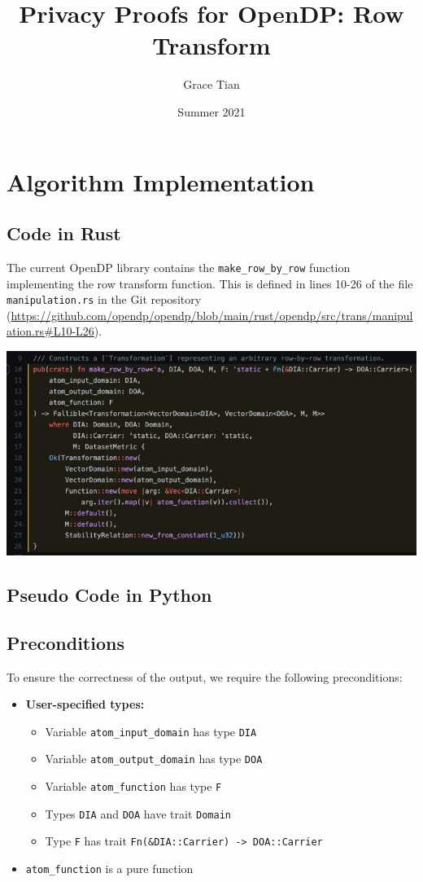 \documentclass[11pt,a4paper]{article}
\title{Privacy Proofs for OpenDP: Row Transform}
\author{Grace Tian}
\date{Summer 2021}
\begin{document}
\maketitle
\tableofcontents


\section{Algorithm Implementation}
\subsection{Code in Rust}
The current OpenDP library contains the \texttt{make\_row\_by\_row} function implementing the row transform function. This is defined in lines 10-26 of the file \texttt{manipulation.rs} in the Git repository (\url{https://github.com/opendp/opendp/blob/main/rust/opendp/src/trans/manipulation.rs#L10-L26}).

\includegraphics[width=\textwidth]{make_row_by_row.jpg}


\subsection{Pseudo Code in Python} \label{sec:pseudocode}

\subsection*{Preconditions}
To ensure the correctness of the output, we require the following preconditions:

\begin{itemize}
    \item \textbf{User-specified types:}
    \begin{itemize}
        \item Variable \texttt{atom\_input\_domain} has type \texttt{DIA}
        \item Variable \texttt{atom\_output\_domain} has type \texttt{DOA}
        \item Variable \texttt{atom\_function} has type \texttt{F}
        \item Types \texttt{DIA} and \texttt{DOA} have trait \texttt{Domain}
        \item Type \texttt{F} has trait \texttt{Fn(\&DIA::Carrier) -> DOA::Carrier} 
    \end{itemize}
    \item \texttt{atom\_function} is a pure function
\end{itemize}
\end{document}
